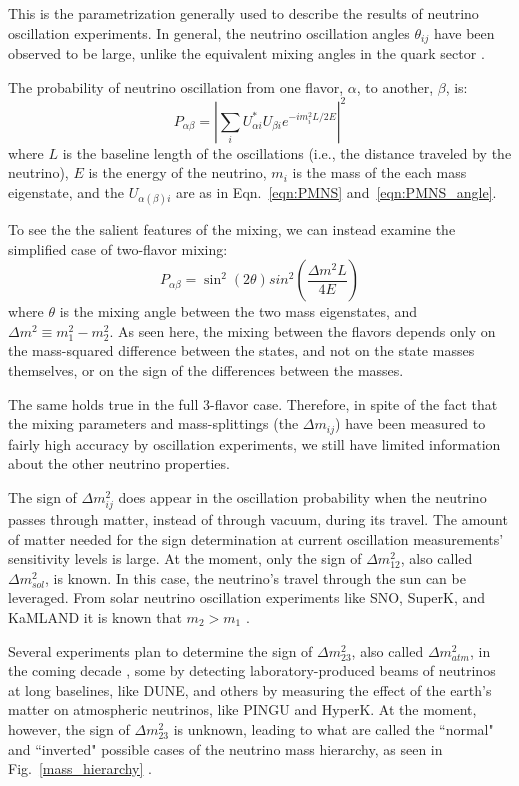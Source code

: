 This is the parametrization generally used to describe the results of neutrino oscillation experiments. In general, the neutrino oscillation angles $\theta_{ij}$ have been observed to be large, unlike the equivalent mixing angles in the quark sector \cite{PDG2014}. 

The probability of neutrino oscillation from one flavor, $\alpha$, to another, $\beta$, is:
$$ 
P_{\alpha\beta} = \left|\sum_i U^*_{\alpha i} U_{\beta i} e^{-im_i^2 L/2E}\right|^2
$$
where $L$ is the baseline length of the oscillations (i.e., the distance traveled by the neutrino), $E$ is the energy of the neutrino, $m_i$ is the mass of the each mass eigenstate, and the $U_{\alpha(\beta) i}$ are as in Eqn.~\ref{eqn:PMNS} and~\ref{eqn:PMNS_angle}. 

To see the the salient features of the mixing, we can instead examine the simplified case of two-flavor mixing:
$$ 
P_{\alpha\beta} = \sin^2(2\theta)sin^2\left(\frac{\Delta m^2 L}{4E}\right)
$$
where $\theta$ is the mixing angle between the two mass eigenstates, and $\Delta m^2 \equiv m_1^2-m_2^2$. As seen here, the mixing between the flavors depends only on the mass-squared difference between the states, and not on the state masses themselves, or on the sign of the differences between the masses. 

The same holds true in the full 3-flavor case. Therefore, in spite of the fact that the mixing parameters and mass-splittings (the $\Delta m_{ij}$) have been measured to fairly high accuracy by oscillation experiments, we still have limited information about the other neutrino properties. 

The sign of $\Delta m_{ij}^2$ does appear in the oscillation probability when the neutrino passes through matter, instead of through vacuum, during its travel. The amount of matter needed for the sign determination at current oscillation measurements' sensitivity levels is large. At the moment, only the sign of $\Delta m_{12}^2$, also called $\Delta m_{sol}^2$, is known. In this case, the neutrino's travel through the sun can be leveraged. From solar neutrino oscillation experiments like SNO, SuperK, and KaMLAND it is known that $m_2 > m_1$ \cite{PDG2014}. 

Several experiments plan to determine the sign of $\Delta m_{23}^2$, also called $\Delta m_{atm}^2$, in the coming decade \cite{Cahn2013}, some by detecting laboratory-produced beams of neutrinos at long baselines, like DUNE, and others by measuring the effect of the earth's matter on atmospheric neutrinos, like PINGU and HyperK.  At the moment, however, the sign of $\Delta m_{23}^2$ is unknown, leading to what are called the ``normal" and ``inverted" possible cases of the neutrino mass hierarchy, as seen in Fig.~\ref{mass_hierarchy}  \cite{Hewett2012}. 

